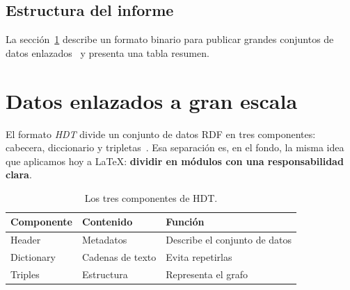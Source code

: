 \medskip
\noindent{}
\medskip

\subsection{Estructura del informe}
La sección~\ref{sec:datos} describe un formato binario para publicar
grandes conjuntos de datos enlazados~\cite{fernandez2013hdt} y
presenta una tabla resumen.

\section{Datos enlazados a gran escala}
\label{sec:datos}

El formato \emph{HDT} divide un conjunto de datos RDF en tres
componentes: cabecera, diccionario y tripletas~\cite{fernandez2013hdt}.
Esa separación es, en el fondo, la misma idea que aplicamos hoy a
LaTeX: \textbf{dividir en módulos con una responsabilidad clara}.

\begin{table}[H]
  \centering
  \begin{tabular}{lll}
    \hline
    \textbf{Componente} & \textbf{Contenido} & \textbf{Función} \\
    \hline
    Header     & Metadatos        & Describe el conjunto de datos \\
    Dictionary & Cadenas de texto & Evita repetirlas \\
    Triples    & Estructura       & Representa el grafo \\
    \hline
  \end{tabular}
  \caption{Los tres componentes de HDT.}
  \label{tab:hdt}
\end{table}


